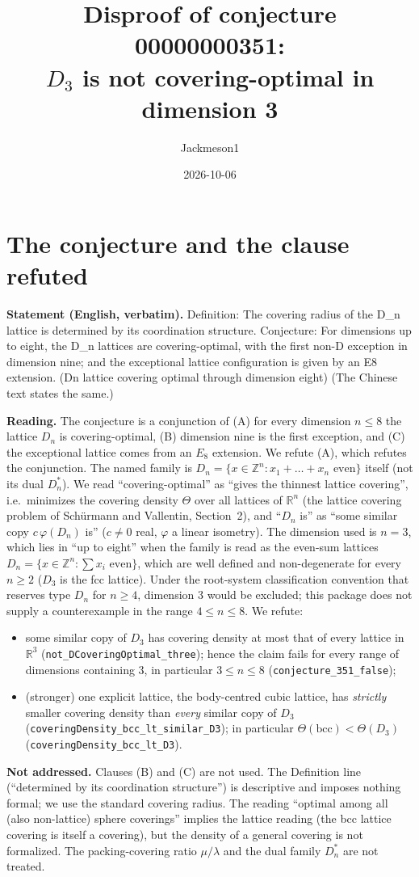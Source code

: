 \documentclass[11pt]{article}
\title{Disproof of conjecture 00000000351:\\ $D_3$ is not covering-optimal in dimension 3}
\author{Jackmeson1}
\date{2026-10-06}
\theoremstyle{definition}
\theoremstyle{remark}
\newcommand{\R}{\mathbb{R}}
\newcommand{\Z}{\mathbb{Z}}
\newcommand{\bcc}{\mathrm{bcc}}
\begin{document}
\maketitle

\section{The conjecture and the clause refuted}

\textbf{Statement (English, verbatim).} Definition: The covering radius of the D\_n lattice is
determined by its coordination structure. Conjecture: For dimensions up to eight, the D\_n lattices
are covering-optimal, with the first non-D exception in dimension nine; and the exceptional lattice
configuration is given by an E8 extension. (Dn lattice covering optimal through dimension eight)
(The Chinese text states the same.)

\textbf{Reading.} The conjecture is a conjunction of (A) for every dimension $n\le 8$ the lattice
$D_n$ is covering-optimal, (B) dimension nine is the first exception, and (C) the exceptional lattice
comes from an $E_8$ extension. We refute (A), which refutes the conjunction. The named family is
$D_n=\{x\in\Z^n: x_1+\dots+x_n \text{ even}\}$ itself (not its dual $D_n^*$). We read
``covering-optimal'' as ``gives the thinnest lattice covering'', i.e.\ minimizes the covering density
$\Theta$ over all lattices of $\R^n$ (the lattice covering problem of Sch\"urmann and Vallentin,
Section~2), and ``$D_n$ is'' as ``some similar copy $c\,\varphi(D_n)$ is'' ($c\ne 0$ real,
$\varphi$ a linear isometry). The dimension used is $n=3$, which lies in ``up to eight'' when the family
is read as the even-sum lattices $D_n=\{x\in\mathbb Z^n:\sum x_i\text{ even}\}$, which are well
defined and non-degenerate for every $n\ge 2$ ($D_3$ is the fcc lattice). Under the
root-system classification convention that reserves type $D_n$ for $n\ge4$, dimension 3 would be
excluded; this package does not supply a counterexample in the range $4\le n\le 8$. We refute:
\begin{itemize}
\item[(R1)] some similar copy of $D_3$ has covering density at most that of every lattice in $\R^3$
  (\texttt{not\_DCoveringOptimal\_three}); hence the claim fails for every range of dimensions
  containing $3$, in particular $3\le n\le 8$ (\texttt{conjecture\_351\_false});
\item[(R2)] (stronger) one explicit lattice, the body-centred cubic lattice, has \emph{strictly}
  smaller covering density than \emph{every} similar copy of $D_3$
  (\texttt{coveringDensity\_bcc\_lt\_similar\_D3}); in particular $\Theta(\bcc)<\Theta(D_3)$
  (\texttt{coveringDensity\_bcc\_lt\_D3}).
\end{itemize}
\textbf{Not addressed.} Clauses (B) and (C) are not used. The Definition line (``determined by its
coordination structure'') is descriptive and imposes nothing formal; we use the standard covering
radius. The reading ``optimal among all (also non-lattice) sphere coverings'' implies the lattice
reading (the bcc lattice covering is itself a covering), but the density of a general covering is not
formalized. The packing-covering ratio $\mu/\lambda$ and the dual family $D_n^*$ are not treated.
\end{document}
